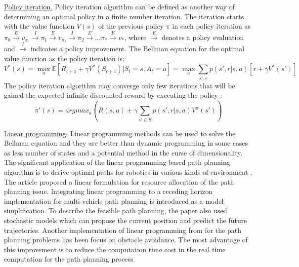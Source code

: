 \noindent\uline{Policy iteration.} Policy iteration algorithm can be defined as another way of determining an optimal policy in a finite number iteration. The iteration starts with the value function $V(s)$ of the previous policy $\pi$ in each policy iteration as $\pi_0\xrightarrow{E}v_{\pi_0}\xrightarrow{I}\pi_1\xrightarrow{E}v_{\pi_1}\xrightarrow{I}\pi_2\xrightarrow{E} ... {\pi_*}\xrightarrow{E}v_*$, where $\xrightarrow{E}$ denotes a policy evaluation and $\xrightarrow{I}$ indicates a policy improvement. The Bellman equation for the optimal value function as the policy iteration is:
\begin{equation}
V^{*}(s) 
= \max_{a} \mathbb{E}[R_{t+1} + \gamma V^{*}(S_{t+1})|S_{t}=s, A_{t}=a] = \max_{a} \sum_{s',r}p(s',r|s,a)[r+\gamma V^{*}(s')]
\end{equation}
The policy iteration algorithm may converge only few iterations that will be gained the expected infinite discounted reward by executing the policy \cite{SuttonBarto18_RLbook}: 
\begin{equation}
\pi'(s)=argmax_{a}(R(s,a)+\gamma \sum_{s'\in S} p(s',r|s,a)V^{\pi}(s'))
\end{equation}

\noindent\uline{Linear programming.} Linear programming methods can be used to solve the Bellman equation and they are better than dynamic programming in some cases as less number of states and a potential method in the curse of dimensionality.
The significant application of the linear programming based path planning algorithm is to derive optimal paths for robotics in various kinds of environment \cite{Chasparis05_PP_LinearProgramming}. The article proposed a linear formulation for resource allocation of the path planning issue. Integrating linear programming to a receding horizon implementation for multi-vehicle path planning is introduced as a model simplification. To describe the feasible path planning, the paper also used stochastic models which can propose the current position and predict the future trajectories. Another implementation of linear programming from \cite{Yang12_PP_LinearProgramming} for the path planning problems has been focus on obstacle avoidance. The most advantage of this improvement is to reduce the computation time cost in the real time computation for the path planning process.